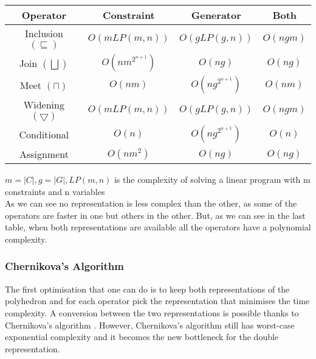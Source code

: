 \begin{center}
\begin{tabular}{||c c c c||} 
 
 \hline
 Operator & Constraint & Generator & Both \\ [0.5ex] 
 \hline
 Inclusion $(\sqsubseteq)$ & $O(mLP(m,n))$ & $O(gLP(g,n))$ & $O(ngm)$ \\ 
 \hline
 Join $(\bigsqcup)$ & $O(nm^{2^{n+1}})$ & $O(ng)$ & $O(ng)$ \\
 \hline
 Meet $(\sqcap)$ & $O(nm)$ & $O(ng^{2^{n+1}})$ & $O(nm)$\\
 \hline
 Widening $(\bigtriangledown)$ & $O(mLP(m,n))$ & $O(gLP(g,n))$ & $O(ngm)$ \\
 \hline
 Conditional & $O(n)$ & $O(ng^{2^{n+1}})$ & $O(n)$ \\ 
 \hline
 Assignment & $O(nm^2)$ & $O(ng)$ & $O(ng)$ \\ 
 
 
 \hline
\end{tabular}
\end{center}
$m=|C|,g=|G|,LP(m,n)$ is the complexity of solving a linear program with m constraints and n variables\\
As we can see no representation is less complex than the other, as some of the operators are faster in one but others in the other. But, as we can see in the last table, when both representations are available all the operators have a polynomial complexity.\\
\subsubsection{Chernikova's Algorithm}
 The first optimisation that one can do is to keep both representations of the polyhedron and for each operator pick the representation that minimises the time complexity. A conversion between the two representations is possible thanks to Chernikova's algorithm \cite{chernikova1968algorithm}. However, Chernikova's algorithm still has worst-case exponential complexity and it becomes the new bottleneck for the double representation.
 
